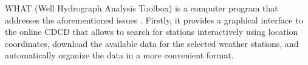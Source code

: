 \documentclass[TechnicalNoteMeteo.tex]{subfiles}
\begin{document}
WHAT (Well Hydrograph Analysis Toolbox) is a computer program that addresses the aforementioned issues \citep{gosselin_user_2015}. Firstly, it provides a graphical interface to the online CDCD that allows to search for stations interactively using location coordinates, download the available data for the selected weather stations, and automatically organize the data in a more convenient format. 

\end{document}
